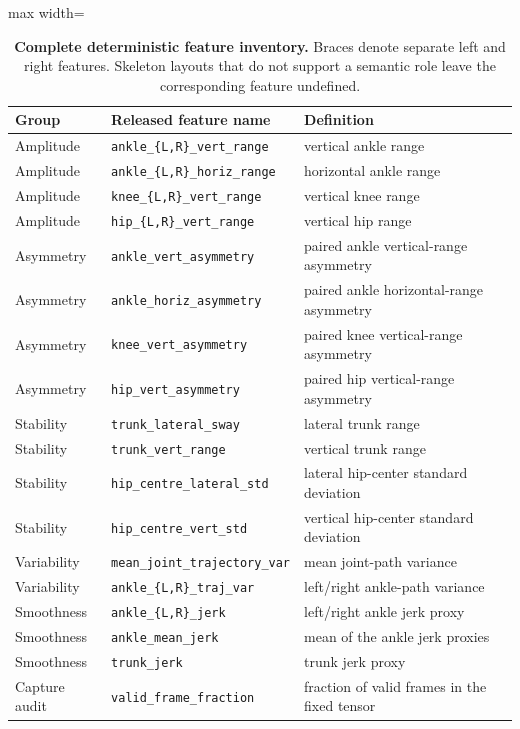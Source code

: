 \begin{table}[H]
\centering
\caption{\textbf{Complete deterministic feature inventory.} Braces denote separate left and right features. Skeleton layouts that do not support a semantic role leave the corresponding feature undefined.}
\label{tab:feature_inventory}
\small
\begin{adjustbox}{max width=\textwidth}
\begin{tabular}{lll}
\toprule
Group & Released feature name & Definition \\
\midrule
Amplitude & \texttt{ankle\_\{L,R\}\_vert\_range} & vertical ankle range \\
Amplitude & \texttt{ankle\_\{L,R\}\_horiz\_range} & horizontal ankle range \\
Amplitude & \texttt{knee\_\{L,R\}\_vert\_range} & vertical knee range \\
Amplitude & \texttt{hip\_\{L,R\}\_vert\_range} & vertical hip range \\
Asymmetry & \texttt{ankle\_vert\_asymmetry} & paired ankle vertical-range asymmetry \\
Asymmetry & \texttt{ankle\_horiz\_asymmetry} & paired ankle horizontal-range asymmetry \\
Asymmetry & \texttt{knee\_vert\_asymmetry} & paired knee vertical-range asymmetry \\
Asymmetry & \texttt{hip\_vert\_asymmetry} & paired hip vertical-range asymmetry \\
Stability & \texttt{trunk\_lateral\_sway} & lateral trunk range \\
Stability & \texttt{trunk\_vert\_range} & vertical trunk range \\
Stability & \texttt{hip\_centre\_lateral\_std} & lateral hip-center standard deviation \\
Stability & \texttt{hip\_centre\_vert\_std} & vertical hip-center standard deviation \\
Variability & \texttt{mean\_joint\_trajectory\_var} & mean joint-path variance \\
Variability & \texttt{ankle\_\{L,R\}\_traj\_var} & left/right ankle-path variance \\
Smoothness & \texttt{ankle\_\{L,R\}\_jerk} & left/right ankle jerk proxy \\
Smoothness & \texttt{ankle\_mean\_jerk} & mean of the ankle jerk proxies \\
Smoothness & \texttt{trunk\_jerk} & trunk jerk proxy \\
Capture audit & \texttt{valid\_frame\_fraction} & fraction of valid frames in the fixed tensor \\
\bottomrule
\end{tabular}
\end{adjustbox}
\end{table}


